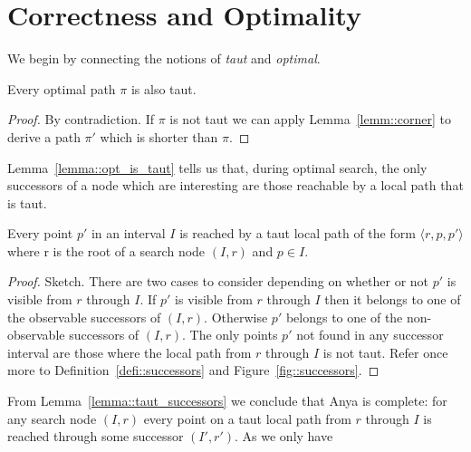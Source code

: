 \section{Correctness and Optimality}
We begin by connecting the notions of \emph{taut} and \emph{optimal}.
\begin{lemm}
\label{lemma::opt_is_taut}
Every optimal path $\pi$ is also taut.
\end{lemm}
\begin{proof}
By contradiction. If $\pi$ is not taut we can apply 
Lemma~\ref{lemm::corner} to derive a path $\pi'$ which is 
shorter than $\pi$. 
\end{proof}
Lemma~\ref{lemma::opt_is_taut} tells us that,
during optimal search, the only successors of a node which
are interesting are those reachable by a local path that is taut.
\begin{lemm}
\label{lemma::taut_successors}
Every point $p'$ in an interval $I$ is reached by a taut local
path of the form $\langle r, p, p' \rangle$ where
r is the root of a search node $(I, r)$ and $p \in I$.
\end{lemm}
\begin{proof}
Sketch. There are two cases to consider depending on whether or not $p'$ is
visible from $r$ through $I$.  If $p'$ is visible from $r$ through $I$ then it
belongs to one of the observable successors of $(I, r)$. Otherwise $p'$ belongs
to one of the non-observable successors of $(I, r)$.  The only points $p'$ not
found in any successor interval are those where the local path from $r$ through 
$I$ is not taut. Refer once more to Definition~\ref{defi::successors} and
Figure~\ref{fig::successors}.
\end{proof}
From Lemma~\ref{lemma::taut_successors} we conclude that Anya is complete: for
any search node $(I, r)$ every point on a taut local path from $r$ through
$I$ is reached through some successor $(I', r')$.  As we only have
